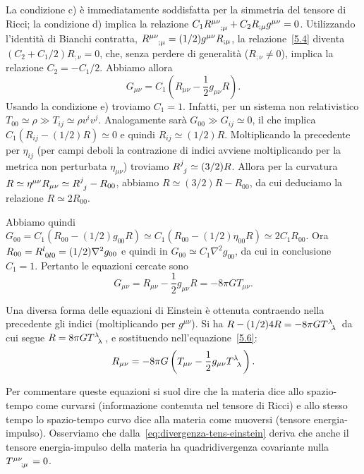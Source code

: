 La condizione c) è immediatamente soddisfatta per la simmetria del tensore di
Ricci; la condizione d) implica la relazione $C_1 \tensor{R}{^{\mu \nu}_{;\mu}}
+ C_2 R_{;\mu} g^{\mu \nu} = 0$.  Utilizzando l'identità di Bianchi contratta,
$\tensor{R}{^{\mu \nu}_{; \mu}} = (1/2) g^{\mu \nu} R_{; \mu}$, la
relazione~\eqref{5.4} diventa $(C_2 + C_1/2) R_{; \nu} =0$, che, senza perdere
di generalità ($R_{; \nu} \ne 0$), implica la relazione $C_2 = -C_1/2$.  Abbiamo
allora
\begin{equation}
  G_{\mu \nu} = C_1 \left(R_{\mu \nu} - \frac{1}{2} g_{\mu \nu} R \right).
\end{equation}
Usando la condizione e) troviamo $C_1=1$.  Infatti, per un sistema non
relativistico $T_{00} \simeq \rho \gg T_{ij} \simeq \rho v^i v^j$.  Analogamente
sarà $G_{00} \gg G_{ij} \simeq 0$, il che implica $C_1 (R_{ij} -(1/2) R) \simeq
0$ e quindi $R_{ij} \simeq (1/2) R$.  Moltiplicando la precedente per
$\eta_{ij}$ (per campi deboli la contrazione di indici avviene moltiplicando per
la metrica non perturbata $\eta_{\mu \nu}$) troviamo $\tensor{R}{^{j}_{j}}
\simeq (3/2) R$.  Allora per la curvatura $R \simeq \eta^{\mu \nu} R_{\mu \nu}
\simeq \tensor{R}{^{j}_{j}} - R_{00}$, abbiamo $R \simeq (3/2)R-R_{00}$, da cui deduciamo la
relazione $R \simeq 2 R_{00}$.

Abbiamo quindi $G_{00} = C_1 (R_{00}-(1/2) g_{00} R) \simeq C_1 (R_{00}-(1/2)
\eta_{00} R) \simeq 2 C_1 R_{00}$.  Ora $R_{00} = \tensor{R}{^{l}_{0l0}} = (1/2)
\nabla^2 g_{00}$ e quindi in $G_{00} \simeq C_1 \nabla^2 g_{00}$, da cui in
conclusione $C_1=1$.  Pertanto le equazioni cercate sono
\begin{equation}
  \label{5.6}
  G_{\mu \nu} = R_{\mu \nu} - \frac{1}{2} g_{\mu \nu} R = -8 \pi G T_{\mu\nu}.
\end{equation}

Una diversa forma delle equazioni di Einstein è ottenuta contraendo nella
precedente gli indici (moltiplicando per $g^{\mu \nu}$).  Si ha $R-(1/2) 4 R =
-8 \pi G \tensor{T}{^{\lambda}_{\lambda}}$ da cui segue $R = 8 \pi G
\tensor{T}{^{\lambda}_{\lambda}}$, e sostituendo nell'equazione~\eqref{5.6}:
\begin{equation}
  R_{\mu \nu}= -8 \pi G \left( T_{\mu \nu} - \frac{1}{2} g_{\mu \nu}
    \tensor{T}{^{\lambda}_{\lambda}} \right).
\end{equation}

Per commentare queste equazioni si suol dire che la materia dice allo
spazio-tempo come curvarsi (informazione contenuta nel tensore di Ricci) e allo
stesso tempo lo spazio-tempo curvo dice alla materia come muoversi (tensore
energia-impulso).  Osserviamo che dalla~\eqref{eq:divergenza-tens-einstein}
deriva che anche il tensore energia-impulso della materia ha quadridivergenza
covariante nulla $\tensor{T}{^{\mu\nu}_{;\mu}} = 0$.

